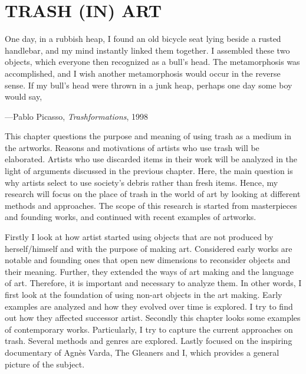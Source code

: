 \chapter{TRASH (IN) ART}



\begin{singlespace}
\epigraph{One day, in a rubbish heap, I found an old bicycle seat lying beside a rusted handlebar, and my mind instantly linked them together. I assembled these two objects, which everyone then recognized as a bull’s head. The metamorphosis was accomplished, and I wish another metamorphosis would occur in the reverse sense. If my bull’s head were thrown in a junk heap, perhaps one day some boy would say, }{\hfill ---Pablo Picasso, \textit{Trashformations}, 1998}
\end{singlespace}



This chapter questions the purpose and meaning of using trash as a medium in the artworks. Reasons and motivations of artists who use trash will be elaborated. Artists who use discarded items in their work will be analyzed in the light of arguments discussed in the previous chapter. Here, the main question is why artists select to use society's debris rather than fresh items. Hence, my research will focus on the place of trash in the world of art by looking at different methods and approaches. The scope of this research is started from masterpieces and founding works, and continued with recent examples of artworks.

Firstly I look at how artist started using objects that are not produced by herself/himself and with the purpose of making art. Considered early works are notable and founding ones that open new dimensions to reconsider objects and their meaning. Further, they extended the ways of art making and the language of art. Therefore, it is important and necessary to analyze them. In other words, I first look at the foundation of using non-art objects in the art making. Early examples are analyzed and how they evolved over time is explored. I try to find out how they affected successor artist. Secondly this chapter looks some examples of contemporary works. Particularly, I try to capture the current approaches on trash. Several methods and genres are explored. Lastly focused on the inspiring documentary of Agnès Varda, The Gleaners and I, which provides a general picture of the subject.



